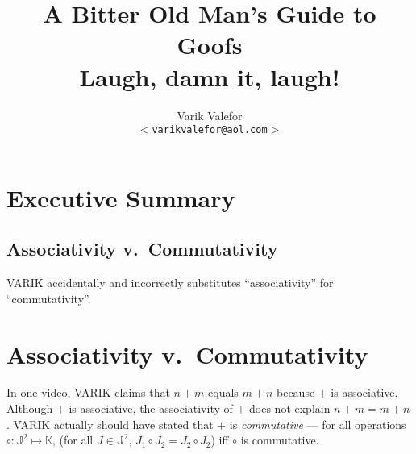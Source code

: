 \documentclass{article}
\title{A Bitter Old Man's Guide to Goofs\\
{\scriptsize Laugh, damn it, laugh!}}
\author{Varik Valefor\\
\texttt{$<$varikvalefor@aol.com$>$}}
\begin{document}
	\maketitle
	\section{Executive Summary}
		\subsection{Associativity v.\ Commutativity}
			VARIK accidentally and incorrectly substitutes ``associativity'' for ``commutativity''.
	\section{Associativity v.\ Commutativity}
		In one video, VARIK claims that $n + m$ equals $m + n$ because $+$ is associative.  Although $+$ is associative, the associativity of $+$ does not explain $n + m = m + n$.  VARIK actually should have stated that $+$ is \textit{commutative} --- for all operations $\circ : \mathbb J^2 \mapsto \mathbb K$, (for all $J \in \mathbb J^2$, $J_1 \circ J_2 = J_2 \circ J_2$) iff $\circ$ is commutative.
\end{document}

